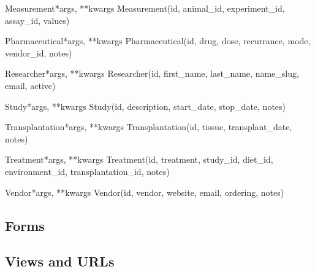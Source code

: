 \documentclass[letterpaper,10pt,english]{sphinxmanual}
\begin{document}
\hypertarget{data.models.Measurement}{}\begin{classdesc}{Measurement}{*args, **kwargs}
Measurement(id, animal\_id, experiment\_id, assay\_id, values)
\end{classdesc}

\hypertarget{data.models.Pharmaceutical}{}\begin{classdesc}{Pharmaceutical}{*args, **kwargs}
Pharmaceutical(id, drug, dose, recurrance, mode, vendor\_id, notes)
\end{classdesc}

\hypertarget{data.models.Researcher}{}\begin{classdesc}{Researcher}{*args, **kwargs}
Researcher(id, first\_name, last\_name, name\_slug, email, active)
\end{classdesc}

\hypertarget{data.models.Study}{}\begin{classdesc}{Study}{*args, **kwargs}
Study(id, description, start\_date, stop\_date, notes)
\end{classdesc}

\hypertarget{data.models.Transplantation}{}\begin{classdesc}{Transplantation}{*args, **kwargs}
Transplantation(id, tissue, transplant\_date, notes)
\end{classdesc}

\hypertarget{data.models.Treatment}{}\begin{classdesc}{Treatment}{*args, **kwargs}
Treatment(id, treatment, study\_id, diet\_id, environment\_id, transplantation\_id, notes)
\end{classdesc}

\hypertarget{data.models.Vendor}{}\begin{classdesc}{Vendor}{*args, **kwargs}
Vendor(id, vendor, website, email, ordering, notes)
\end{classdesc}


\subsection{Forms}
\hypertarget{module-data.forms}{}
\modulesynopsis{}

\subsection{Views and URLs}
\hypertarget{module-data.views}{}
\modulesynopsis{}
\hypertarget{module-data.urls}{}
\modulesynopsis{}
\end{document}
